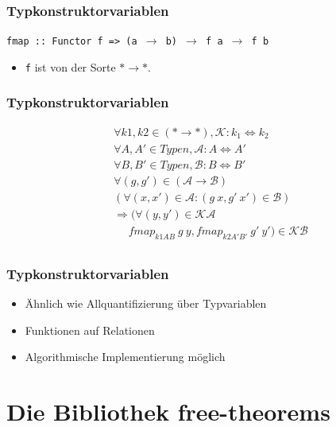 \documentclass{beamer}
\begin{document}
\begin{frame}
\frametitle{Typkonstruktorvariablen}
\texttt{fmap :: Functor f => (a $\rightarrow$ b) $\rightarrow$ f\ a $\rightarrow$ f\ b}

\begin{itemize}
\item \texttt{f} ist von der Sorte $* \rightarrow *$.
\end{itemize}
\end{frame}

\begin{frame}
\frametitle{Typkonstruktorvariablen}
\begin{align*}
&\forall k1, k2 \in (* \rightarrow *), \mathcal{K} : k_1 \Leftrightarrow k_2 \\
&\forall A, A' \in Typen, \mathcal{A} : A \Leftrightarrow A' \\
&\forall B, B' \in Typen, \mathcal{B} : B \Leftrightarrow B' \\
&\forall (g, g') \in (\mathcal{A} \rightarrow \mathcal{B}) \\
&(\forall (x, x') \in \mathcal{A}: (g\ x, g'\ x') \in \mathcal{B})\\
&\Rightarrow (\forall (y, y') \in \mathcal{K} \mathcal{A} \\
&\ \ \ \ \ \ fmap_{k1 A B}\ g\ y, fmap_{k2 A' B'}\ g'\ y') \in \mathcal{K} \mathcal{B}\\
\end{align*}
\end{frame}

\begin{frame}
\frametitle{Typkonstruktorvariablen}
\begin{itemize}
\item Ähnlich wie Allquantifizierung über Typvariablen
\item Funktionen auf Relationen
\item Algorithmische Implementierung möglich
\end{itemize}
\end{frame}

\section{Die Bibliothek free-theorems}
\end{document}
